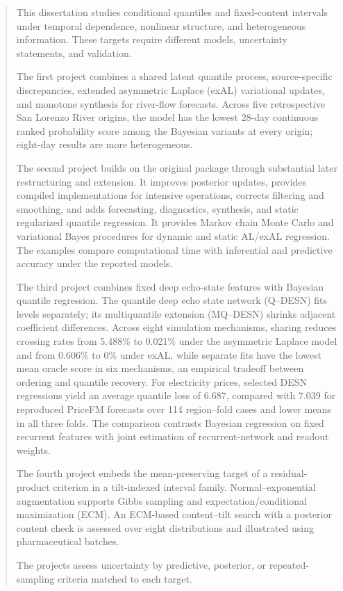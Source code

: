 \begin{abstract}
This dissertation studies conditional quantiles and fixed-content intervals
under temporal dependence, nonlinear structure, and heterogeneous information.
These targets require different models, uncertainty statements, and validation.

The first project combines a shared latent quantile process, source-specific
discrepancies, extended asymmetric Laplace (exAL) variational updates, and
monotone synthesis for river-flow forecasts. Across five retrospective San
Lorenzo River origins, the model has the lowest 28-day continuous ranked
probability score among the Bayesian variants at every origin; eight-day
results are more heterogeneous.

The second project builds on the original   package
through substantial later restructuring and extension. It improves posterior
updates, provides compiled
implementations for intensive operations, corrects filtering and smoothing,
and adds forecasting, diagnostics, synthesis, and static regularized quantile
regression. It provides Markov chain Monte Carlo and variational Bayes
procedures for dynamic and static AL/exAL regression. The examples compare
computational time with inferential and predictive accuracy under the reported
models.

The third project combines fixed deep echo-state features with Bayesian
quantile regression. The quantile deep echo state network (Q--DESN) fits levels
separately; its multiquantile extension (MQ--DESN) shrinks adjacent coefficient
differences. Across eight simulation mechanisms, sharing reduces crossing rates
from 5.488\% to 0.021\% under the asymmetric Laplace model and from 0.606\% to
0\% under exAL, while separate fits have the lowest mean oracle score in six
mechanisms, an empirical tradeoff between ordering and quantile recovery.
For electricity prices, selected DESN regressions yield an average quantile
loss of 6.687, compared with 7.039 for reproduced PriceFM forecasts over 114
region--fold cases and lower means in all three folds. The
comparison contrasts Bayesian regression on fixed recurrent features with
joint estimation of recurrent-network and readout weights.

The fourth project embeds the mean-preserving target of a residual-product
criterion in a tilt-indexed interval family. Normal--exponential augmentation
supports Gibbs sampling and expectation/conditional maximization (ECM).
An ECM-based content--tilt search with a
posterior content check is assessed over eight distributions and illustrated
using pharmaceutical batches.

The projects assess uncertainty by predictive, posterior, or repeated-sampling
criteria matched to each target.
\end{abstract}
